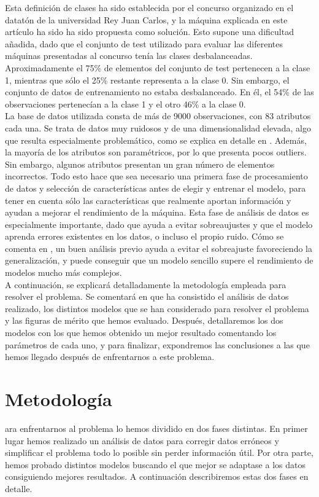 \documentclass[journal,twoside]{JoPhA}
\begin{document}
Esta definición de clases ha sido establecida por el concurso organizado en el datatón de la universidad Rey Juan Carlos, y la máquina explicada en este artículo ha sido ha sido propuesta como solución. Esto supone una dificultad añadida, dado que el conjunto de test utilizado para evaluar las diferentes máquinas presentadas al concurso tenía las clases desbalanceadas. Aproximadamente el 75\% de elementos del conjunto de test pertenecen a la clase 1, mientras que sólo el 25\% restante representa a la clase 0. Sin embargo, el conjunto de datos de entrenamiento no estaba desbalanceado. En él, el 54\% de las observaciones pertenecían a la clase 1 y el otro 46\% a la clase 0. \\

La base de datos utilizada consta de más de 9000 observaciones, con 83 atributos cada una. Se trata de datos muy ruidosos y de una dimensionalidad elevada, algo que resulta especialmente problemático, como se explica en detalle en \cite{alta_dimensionalidad}. Además, la mayoría de los atributos son paramétricos, por lo que presenta pocos outliers. Sin embargo, algunos atributos presentan un gran número de elementos incorrectos. Todo esto hace que sea necesario una primera fase de procesamiento de datos y selección de características antes de elegir y entrenar el modelo, para tener en cuenta sólo las características que realmente aportan información y ayudan a mejorar el rendimiento de la máquina. Esta fase de análisis de datos es especialmente importante, dado que ayuda a evitar sobreaujustes y que el modelo aprenda errores existentes en los datos, o incluso el propio ruido. Cómo se comenta en \cite{extraccion_datos}, un buen análisis previo ayuda a evitar el sobreajuste favoreciendo la generalización, y puede conseguir que un modelo sencillo supere el rendimiento de modelos mucho más complejos. \\

A continuación, se explicará detalladamente la metodología empleada para resolver el problema. Se comentará en que ha consistido el análisis de datos realizado, los distintos modelos que se han considerado para resolver el problema y las figuras de mérito que hemos evaluado. Después, detallaremos los dos modelos con los que hemos obtenido un mejor resultado comentando los parámetros de cada uno, y para finalizar, expondremos las conclusiones a las que hemos llegado después de enfrentarnos a este problema. \\


\section{Metodología}
ara enfrentarnos al problema lo hemos dividido en dos fases distintas. En primer lugar hemos realizado un análisis de datos para corregir datos erróneos y simplificar el problema todo lo posible sin perder información útil. Por otra parte, hemos probado distintos modelos buscando el que mejor se adaptase a los datos consiguiendo mejores resultados. A continuación describiremos estas dos fases en detalle.
\end{document}
